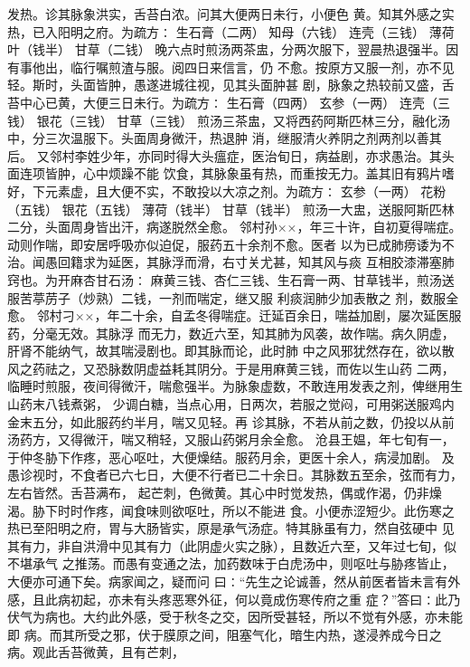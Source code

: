 \documentclass[a4paper,12pt,UTF8,twoside]{ctexbook}
\begin{document}
发热。诊其脉象洪实，舌苔白浓。问其大便两日未行，小便色 
黄。知其外感之实热，已入阳明之府。为疏方∶ 
生石膏（二两） 知母（六钱） 连壳（三钱） 薄荷叶（钱半） 甘草（二钱） 
晚六点时煎汤两茶盅，分两次服下，翌晨热退强半。因有事他出，临行嘱煎渣与服。阅四日来信言，仍 
不愈。按原方又服一剂，亦不见轻。斯时，头面皆肿，愚遂进城往视，见其头面肿甚 
剧，脉象之热较前又盛，舌苔中心已黄，大便三日未行。为疏方∶ 
生石膏（四两） 玄参（一两） 连壳（三钱） 银花（三钱） 甘草（三钱） 
煎汤三茶盅，又将西药阿斯匹林三分，融化汤中，分三次温服下。头面周身微汗，热退肿 
消，继服清火养阴之剂两剂以善其后。 
又邻村李姓少年，亦同时得大头瘟症，医治旬日，病益剧，亦求愚治。其头面连项皆肿，心中烦躁不能 
饮食，其脉象虽有热，而重按无力。盖其旧有鸦片嗜好，下元素虚，且大便不实，不敢投以大凉之剂。为疏方∶ 
玄参（一两） 花粉（五钱） 银花（五钱） 薄荷（钱半） 甘草（钱半） 
煎汤一大盅，送服阿斯匹林二分，头面周身皆出汗，病遂脱然全愈。 
邻村孙××，年三十许，自初夏得喘症。动则作喘，即安居呼吸亦似迫促，服药五十余剂不愈。医者 
以为已成肺痨诿为不治。闻愚回籍求为延医，其脉浮而滑，右寸关尤甚，知其风与痰 
互相胶漆滞塞肺窍也。为开麻杏甘石汤∶ 
麻黄三钱、杏仁三钱、生石膏一两、甘草钱半，煎汤送服苦葶苈子（炒熟）二钱，一剂而喘定，继又服 
利痰润肺少加表散之 
剂，数服全愈。 
邻村刁××，年二十余，自孟冬得喘症。迁延百余日，喘益加剧，屡次延医服药，分毫无效。其脉浮 
而无力，数近六至，知其肺为风袭，故作喘。病久阴虚，肝肾不能纳气，故其喘浸剧也。即其脉而论，此时肺 
中之风邪犹然存在，欲以散风之药祛之，又恐脉数阴虚益耗其阴分。于是用麻黄三钱，而佐以生山药 
二两，临睡时煎服，夜间得微汗，喘愈强半。为脉象虚数，不敢连用发表之剂，俾继用生山药末八钱煮粥， 
少调白糖，当点心用，日两次，若服之觉闷，可用粥送服鸡内金末五分，如此服药约半月，喘又见轻。再 
诊其脉，不若从前之数，仍投以从前汤药方，又得微汗，喘又稍轻，又服山药粥月余全愈。 
沧县王媪，年七旬有一，于仲冬胁下作疼，恶心呕吐，大便燥结。服药月余，更医十余人，病浸加剧。 
及愚诊视时，不食者已六七日，大便不行者已二十余日。其脉数五至余，弦而有力，左右皆然。舌苔满布， 
起芒刺，色微黄。其心中时觉发热，偶或作渴，仍非燥渴。胁下时时作疼，闻食味则欲呕吐，所以不能进 
食。小便赤涩短少。此伤寒之热已至阳明之府，胃与大肠皆实，原是承气汤症。特其脉虽有力，然自弦硬中 
见其有力，非自洪滑中见其有力（此阴虚火实之脉），且数近六至，又年过七旬，似不堪承气 
之推荡。而愚有变通之法，加药数味于白虎汤中，则呕吐与胁疼皆止，大便亦可通下矣。病家闻之，疑而问 
曰∶“先生之论诚善，然从前医者皆未言有外感，且此病初起，亦未有头疼恶寒外征，何以竟成伤寒传府之重 
症？”答曰∶此乃伏气为病也。大约此外感，受于秋冬之交，因所受甚轻，所以不觉有外感，亦未能即 
病。而其所受之邪，伏于膜原之间，阻塞气化，暗生内热，遂浸养成今日之病。观此舌苔微黄，且有芒刺， 
\end{document}
